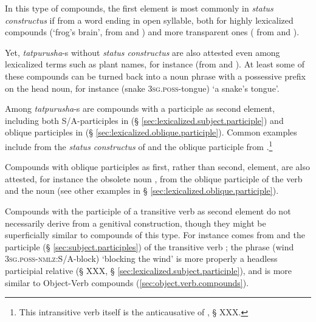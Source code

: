 In this type of compounds, the first element is most commonly in \textit{status constructus} if from a word ending in open syllable, both for highly lexicalized compounds  (`frog's brain', from  and ) and more transparent ones ( from   and ). 

Yet, \textit{tatpurusha}-s without \textit{status constructus} are also attested even among lexicalized terms such as plant names, for instance  (from  and ). At least some of these compounds can be turned back into a noun phrase with a possessive prefix on the head noun, for instance  (snake \textsc{3sg.poss}-tongue) `a snake's tongue'.

Among \textit{tatpurusha}-s are compounds with a participle as second element, including both S/A-participles in  (§ \ref{sec:lexicalized.subject.participle}) and oblique participles in  (§ \ref{sec:lexicalized.oblique.participle}). Common examples include   from the \textit{status constructus} of  and the oblique participle  from .\footnote{This intransitive verb itself is the anticausative of , § XXX. }

Compounds with oblique participles as first, rather than second, element, are also attested, for instance the obsolete noun , from the oblique participle  of the verb  and the noun  (see other examples in § \ref{sec:lexicalized.oblique.participle}).

Compounds with the participle of a transitive verb as second element do not necessarily derive from a genitival construction, though they might be superficially similar to compounds of this type. For instance  comes from  and the participle  (§ \ref{sec:subject.participles}) of the transitive verb ; the phrase  (wind \textsc{3sg.poss}-\textsc{nmlz}:S/A-block) `blocking the wind' is more properly a headless participial relative (§ XXX, § \ref{sec:lexicalized.subject.participle}), and is more similar to Object-Verb compounds (\ref{sec:object.verb.compounds}).

